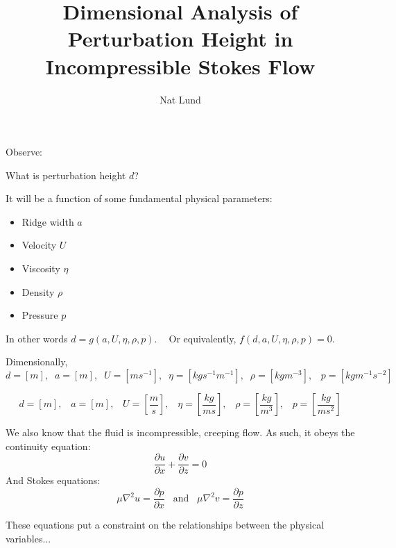 \documentclass[]{article}
\title{Dimensional Analysis of Perturbation Height in Incompressible Stokes Flow}
\author{Nat Lund}
\begin{document}
\maketitle

Observe:
\vspace{1em}

\vspace{1em}

What is perturbation height $d$?

It will be a function of some fundamental physical parameters:
\begin{itemize}
    \item Ridge width $a$
    \item Velocity $U$
    \item Viscosity $\eta$
    \item Density $\rho$
    \item Pressure $p$
\end{itemize}

In other words $d = g(a, U, \eta, \rho, p )$. $\;\;$ Or equivalently, $f(d,a,U,\eta, \rho, p)=0$.

Dimensionally,
\[d = [m],\;\; a = [m],\;\; U = [ms^{-1}],\;\; \eta = [kg s^{-1} m^{-1}],\;\; \rho = [kg m^{-3}], \;\;\; p = [kg m^{-1} s^{-2}] \]

\[ d = [m],\;\;\; a = [m],\;\;\; U = \left[\frac{m}{s} \right],\;\;\;
 \eta = \left[\frac{kg}{ms} \right],\;\;\; \rho = \left[\frac{kg}{m^{3}} \right]
 ,\;\;\; p = \left[ \frac{kg}{m s^{2}} \right] \]
 
We also know that the fluid is incompressible, creeping flow.  As such, it obeys the continuity equation:
\[ \frac{\partial u}{\partial x} + \frac{\partial v}{\partial z} = 0 \]
And Stokes equations:
\[ \mu \nabla^2 u = \frac{\partial p}{\partial x} \;\;\; \text{and} \;\;\;
\mu \nabla^2 v = \frac{\partial p}{\partial z} \]

These equations put a constraint on the relationships between the physical variables...
\end{document}
